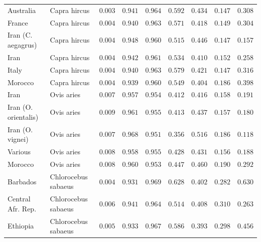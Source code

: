 \documentclass{article}
\begin{document}
\begin{table}[tb]
\begin{adjustbox}{width=\textwidth}
\begin{tabular}{||l|l|r||r|r||r|r||r|r||}
                \rowcolor{LIGHTGREY} Australia              & Capra hircus        & $ 0.003$ & $ 0.941$ & $ 0.964$ & $ 0.592$ & $ 0.434$ & $ 0.147$ & $ 0.308$ \\
                \rowcolor{LIGHTGREY} France                 & Capra hircus          & $ 0.004$ & $ 0.940$ & $ 0.963$ & $ 0.571$ & $ 0.418$ & $ 0.149$ & $ 0.304$ \\
                \rowcolor{LIGHTGREY} Iran (C. aegagrus) & Capra hircus          & $ 0.004$ & $ 0.948$ & $ 0.960$ & $ 0.515$ & $ 0.446$ & $ 0.147$ & $ 0.157$ \\
                \rowcolor{LIGHTGREY} Iran     & Capra hircus          & $ 0.004$ & $ 0.942$ & $ 0.961$ & $ 0.534$ & $ 0.410$ & $ 0.152$ & $ 0.258$ \\
                \rowcolor{LIGHTGREY} Italy              & Capra hircus          & $ 0.004$ & $ 0.940$ & $ 0.963$ & $ 0.579$ & $ 0.421$ & $ 0.147$ & $ 0.316$ \\
                Morocco              & Capra hircus          & $ 0.004$ & $ 0.939$ & $ 0.960$ & $ 0.549$ & $ 0.404$ & $ 0.186$ & $ 0.398$ \\
                Iran             & Ovis aries & $ 0.007$ & $ 0.957$ & $ 0.954$ & $ 0.412$ & $ 0.416$ & $ 0.158$ & $ 0.191$ \\
                Iran (O. orientalis)    & Ovis aries & $ 0.009$ & $ 0.961$ & $ 0.955$ & $ 0.413$ & $ 0.437$ & $ 0.157$ & $ 0.180$ \\
                Iran (O. vignei)             & Ovis aries & $ 0.007$ & $ 0.968$ & $ 0.951$ & $ 0.356$ & $ 0.516$ & $ 0.186$ & $ 0.118$ \\
                Various               & Ovis aries & $ 0.008$ & $ 0.958$ & $ 0.955$ & $ 0.428$ & $ 0.431$ & $ 0.156$ & $ 0.188$ \\
                Morocco                & Ovis aries & $ 0.008$ & $ 0.960$ & $ 0.953$ & $ 0.447$ & $ 0.460$ & $ 0.190$ & $ 0.292$ \\
                \rowcolor{LIGHTGREY} Barbados                & Chlorocebus sabaeus & $ 0.004$ & $ 0.931$ & $ 0.969$ & $ 0.628$ & $ 0.402$ & $ 0.282$ & $ 0.630$ \\
                \rowcolor{LIGHTGREY} Central Afr. Rep.         & Chlorocebus sabaeus & $ 0.006$ & $ 0.941$ & $ 0.964$ & $ 0.514$ & $ 0.408$ & $ 0.310$ & $ 0.263$ \\
                \rowcolor{LIGHTGREY} Ethiopia          & Chlorocebus sabaeus & $ 0.005$ & $ 0.933$ & $ 0.967$ & $ 0.586$ & $ 0.393$ & $ 0.298$ & $ 0.456$ \\

\end{tabular}
\end{adjustbox}
\end{table}
\end{document}
